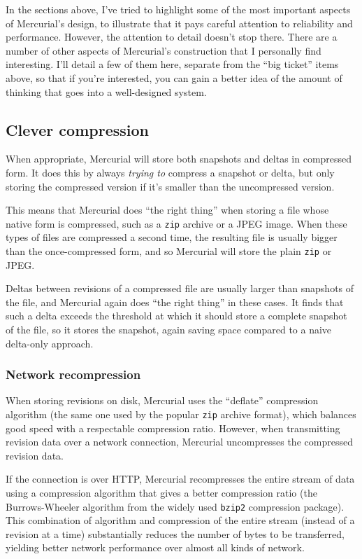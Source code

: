 In the sections above, I've tried to highlight some of the most
important aspects of Mercurial's design, to illustrate that it pays
careful attention to reliability and performance.  However, the
attention to detail doesn't stop there.  There are a number of other
aspects of Mercurial's construction that I personally find
interesting.  I'll detail a few of them here, separate from the ``big
ticket'' items above, so that if you're interested, you can gain a
better idea of the amount of thinking that goes into a well-designed
system.

\subsection{Clever compression}

When appropriate, Mercurial will store both snapshots and deltas in
compressed form.  It does this by always \emph{trying to} compress a
snapshot or delta, but only storing the compressed version if it's
smaller than the uncompressed version.

This means that Mercurial does ``the right thing'' when storing a file
whose native form is compressed, such as a \texttt{zip} archive or a
JPEG image.  When these types of files are compressed a second time,
the resulting file is usually bigger than the once-compressed form,
and so Mercurial will store the plain \texttt{zip} or JPEG.

Deltas between revisions of a compressed file are usually larger than
snapshots of the file, and Mercurial again does ``the right thing'' in
these cases.  It finds that such a delta exceeds the threshold at
which it should store a complete snapshot of the file, so it stores
the snapshot, again saving space compared to a naive delta-only
approach.

\subsubsection{Network recompression}

When storing revisions on disk, Mercurial uses the ``deflate''
compression algorithm (the same one used by the popular \texttt{zip}
archive format), which balances good speed with a respectable
compression ratio.  However, when transmitting revision data over a
network connection, Mercurial uncompresses the compressed revision
data.

If the connection is over HTTP, Mercurial recompresses the entire
stream of data using a compression algorithm that gives a better
compression ratio (the Burrows-Wheeler algorithm from the widely used
\texttt{bzip2} compression package).  This combination of algorithm
and compression of the entire stream (instead of a revision at a time)
substantially reduces the number of bytes to be transferred, yielding
better network performance over almost all kinds of network.

